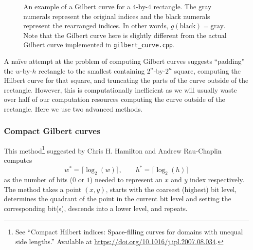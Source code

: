 \documentclass[12pt, a4paper, twoside]{article}
\begin{document}
\begin{figure}[t!]
\centering

\caption{An example of a Gilbert curve for a $4$-by-$4$ rectangle. The gray numerals represent the original indices and the black numerals represent the rearranged indices. In other words, $g(\text{black}) = \text{gray}$. Note that the Gilbert curve here is slightly different from the actual Gilbert curve implemented in \texttt{gilbert\_curve.cpp}.}
\label{fig:gilbert_curve}
\end{figure}

A na\"{i}ve attempt at the problem of computing Gilbert curves suggests ``padding'' the $w$-by-$h$ rectangle to the smallest containing $2^n$-by-$2^n$ square, computing the Hilbert curve for that square, and truncating the parts of the curve outside of the rectangle. However, this is computationally inefficient as we will usually waste over half of our computation resources computing the curve outside of the rectangle. Here we use two advanced methods.

\subsubsection{Compact Gilbert curves}

This method\footnote{See ``Compact Hilbert indices: Space-filling curves for domains with unequal side lengths.'' Available at \url{https://doi.org/10.1016/j.ipl.2007.08.034}.} suggested by Chris H. Hamilton and Andrew Rau-Chaplin computes
\begin{equation}
    w^* = \lceil \log_2(w) \rceil, \qquad h^* = \lceil \log_2(h) \rceil
\end{equation}
as the number of bits ($0$ or $1$) needed to represent an $x$ and $y$ index respectively. The method takes a point $(x, y)$, starts with the coarsest (highest) bit level, determines the quadrant of the point in the current bit level and setting the corresponding bit(s), descends into a lower level, and repeats.
\end{document}
